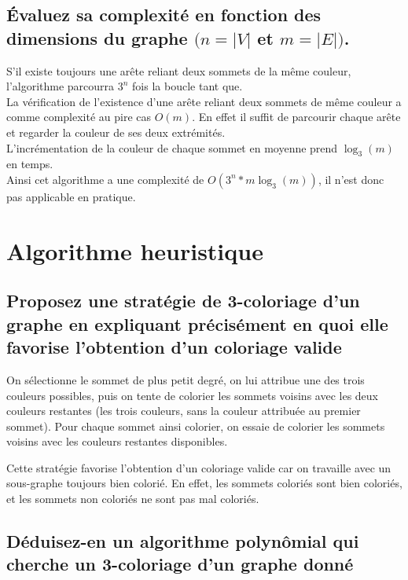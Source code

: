 \documentclass[a4paper, 11pt]{article}
\begin{document}
    \subsection{Évaluez sa complexité en fonction des dimensions du graphe $(n = |V| $ et $ m = |E|)$.}\label{subsec:Q2B}
    S'il existe toujours une arête reliant deux sommets de la même couleur, l'algorithme parcourra $3^n$ fois la boucle tant que.\\
    La vérification de l'existence d'une arête reliant deux sommets de même couleur a comme complexité au pire cas $O(m)$.
    En effet il suffit de parcourir chaque arête et regarder la couleur de ses deux extrémités.\\
    L'incrémentation de la couleur de chaque sommet en moyenne prend $\log_3(m)$ en temps.\\
    Ainsi cet algorithme a une complexité de $O(3^n*m\log_3(m))$, il n'est donc pas applicable en pratique.

    \newpage

    \section{Algorithme heuristique}\label{sec:algorithme-heuristique}

    \subsection{Proposez une stratégie de 3-coloriage d'un graphe
    en expliquant précisément en quoi elle favorise l'obtention d'un coloriage valide}\label{subsec:Q3A}
    On sélectionne le sommet de plus petit degré, on lui attribue une des trois couleurs possibles,
    puis on tente de colorier les sommets voisins avec les deux couleurs restantes (les trois couleurs, sans la couleur attribuée au premier sommet).
    Pour chaque sommet ainsi colorier, on essaie de colorier les sommets voisins avec les couleurs restantes disponibles.

    Cette stratégie favorise l'obtention d'un coloriage valide car on travaille avec un sous-graphe toujours bien colorié.
    En effet, les sommets coloriés sont bien coloriés, et les sommets non coloriés ne sont pas mal coloriés.

    \subsection{Déduisez-en un algorithme polynômial qui cherche un 3-coloriage d’un graphe donné}\label{subsec:Q3B}
\end{document}
